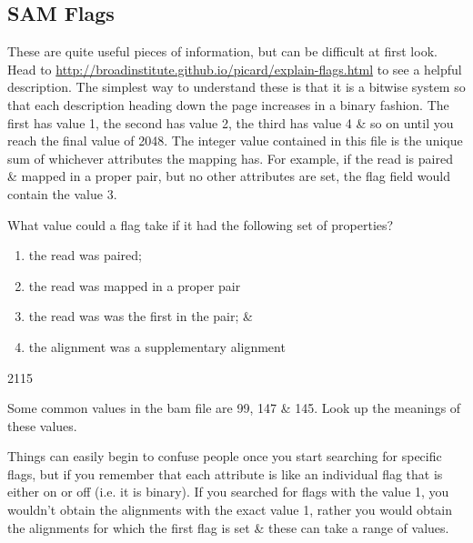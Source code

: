 \subsection{SAM Flags}
\begin{information}
These are quite useful pieces of information, but can be difficult at first look.
Head to \url{http://broadinstitute.github.io/picard/explain-flags.html} to see a helpful description.
The simplest way to understand these is that it is a bitwise system so that each description heading down the page increases in a binary fashion.
The first has value 1, the second has value 2, the third has value 4 \& so on until you reach the final value of 2048.
The integer value contained in this file is the unique sum of whichever attributes the mapping has.
For example, if the read is paired \& mapped in a proper pair, but no other attributes are set, the flag field would contain the value 3.
\end{information}

\begin{questions}
What value could a flag take if it had the following set of properties?
	\begin{enumerate}
	\item the read was paired; 
	\item the read was mapped in a proper pair
	\item the read was was the first in the pair; \& 
	\item the alignment was a supplementary alignment
	\end{enumerate}
\begin{answer}
2115 \\
\end{answer}
Some common values in the bam file are 99, 147 \& 145.
Look up the meanings of these values. \\
\end{questions}

\begin{information}
Things can easily begin to confuse people once you start searching for specific flags, but if you remember that each attribute is like an individual flag that is either on or off (i.e. it is binary).
If you searched for flags with the value 1, you wouldn't obtain the alignments with the exact value 1, rather you would obtain the alignments for which the first flag is set \& these can take a range of values.
\end{information}

